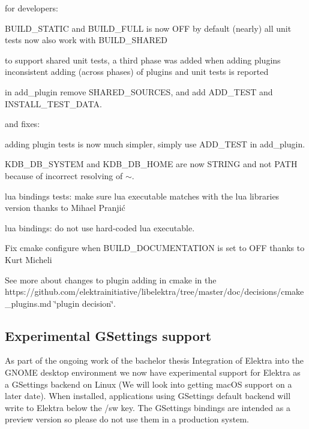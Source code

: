 for developers\+:


\begin{DoxyItemize}
\item B\+U\+I\+L\+D\+\_\+\+S\+T\+A\+T\+IC and B\+U\+I\+L\+D\+\_\+\+F\+U\+LL is now O\+FF by default (nearly) all unit tests now also work with B\+U\+I\+L\+D\+\_\+\+S\+H\+A\+R\+ED
\item to support shared unit tests, a third phase was added when adding plugins inconsistent adding (across phases) of plugins and unit tests is reported
\item in {\ttfamily add\+\_\+plugin} remove S\+H\+A\+R\+E\+D\+\_\+\+S\+O\+U\+R\+C\+ES, and add {\ttfamily A\+D\+D\+\_\+\+T\+E\+ST} and {\ttfamily I\+N\+S\+T\+A\+L\+L\+\_\+\+T\+E\+S\+T\+\_\+\+D\+A\+TA}.
\end{DoxyItemize}

and fixes\+:


\begin{DoxyItemize}
\item adding plugin tests is now much simpler, simply use {\ttfamily A\+D\+D\+\_\+\+T\+E\+ST} in {\ttfamily add\+\_\+plugin}.
\item K\+D\+B\+\_\+\+D\+B\+\_\+\+S\+Y\+S\+T\+EM and K\+D\+B\+\_\+\+D\+B\+\_\+\+H\+O\+ME are now S\+T\+R\+I\+NG and not P\+A\+TH because of incorrect resolving of {\ttfamily $\sim$}.
\item lua bindings tests\+: make sure lua executable matches with the lua libraries version thanks to Mihael Pranjić
\item lua bindings\+: do not use hard-\/coded {\ttfamily lua} executable.
\item Fix cmake configure when B\+U\+I\+L\+D\+\_\+\+D\+O\+C\+U\+M\+E\+N\+T\+A\+T\+I\+ON is set to O\+FF thanks to Kurt Micheli
\end{DoxyItemize}

See more about changes to plugin adding in cmake in the https\+://github.com/elektrainitiative/libelektra/tree/master/doc/decisions/cmake\+\_\+plugins.\+md \char`\"{}plugin decision\char`\"{}.

\subsection*{Experimental G\+Settings support}

As part of the ongoing work of the bachelor thesis {\ttfamily Integration of Elektra into the G\+N\+O\+ME desktop environment} we now have experimental support for Elektra as a G\+Settings backend on Linux (We will look into getting mac\+OS support on a later date). When installed, applications using G\+Settings default backend will write to Elektra below the {\ttfamily /sw} key. The G\+Settings bindings are intended as a preview version so please do not use them in a production system.

